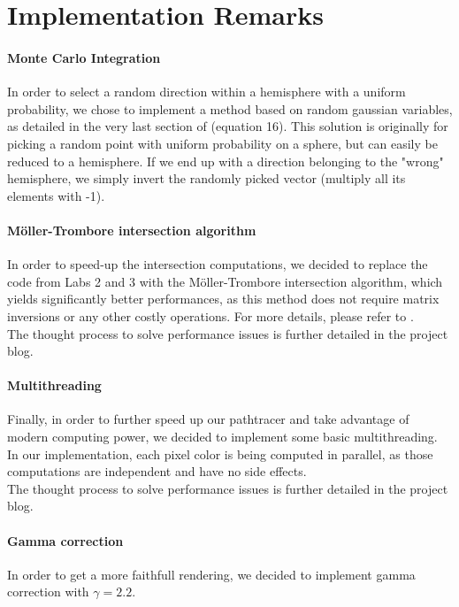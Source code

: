 \documentclass[12pt, oneside]{report}
\begin{document}
\section*{Implementation Remarks}

\paragraph{Monte Carlo Integration} In order to select a random direction within a hemisphere with a uniform probability, we chose to implement a method based on random gaussian variables, as detailed in the very last section of \cite{randomPointSphere} (equation 16). This solution is originally for picking a random point with uniform probability on a sphere, but can easily be reduced to a hemisphere. If we end up with a direction belonging to the "wrong" hemisphere, we simply invert the randomly picked vector (multiply all its elements with -1).

\paragraph{Möller-Trombore intersection algorithm} In order to speed-up the intersection computations, we decided to replace the code from Labs 2 and 3 with the Möller-Trombore intersection algorithm, which yields significantly better performances, as this method does not require matrix inversions or any other costly operations. For more details, please refer to \cite{mollerTrumbore}. \\ The thought process to solve performance issues is further detailed in the project blog.

\paragraph{Multithreading}Finally, in order to further speed up our pathtracer and take advantage of modern computing power, we decided to implement some basic multithreading. In our implementation, each pixel color is being computed in parallel, as those computations are independent and have no side effects. \\ The thought process to solve performance issues is further detailed in the project blog.

\paragraph{Gamma correction} In order to get a more faithfull rendering, we decided to implement gamma correction with $\gamma = 2.2$.
\end{document}

